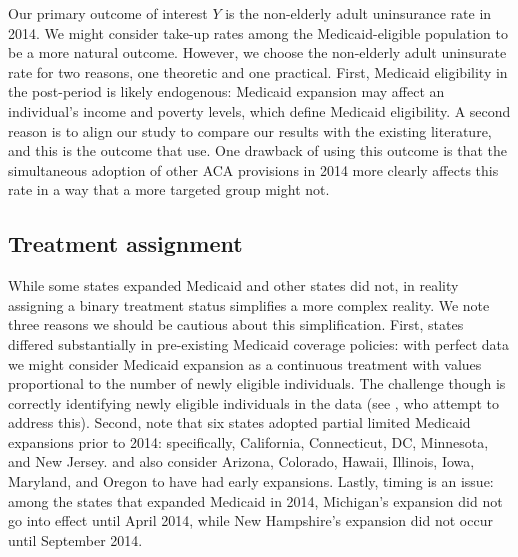\documentclass[12pt]{article}
\begin{document}
Our primary outcome of interest $Y$ is the non-elderly adult uninsurance rate in 2014. We might consider take-up rates among the Medicaid-eligible population to be a more natural outcome. However, we choose the non-elderly adult uninsurate rate for two reasons, one theoretic and one practical. First, Medicaid eligibility in the post-period is likely endogenous: Medicaid expansion may affect an individual's income and poverty levels, which define Medicaid eligibility. A second reason is to align our study to compare our results with the existing literature, and this is the outcome that \cite{courtemanche2017early} use. One drawback of using this outcome is that the simultaneous adoption of other ACA provisions in 2014 more clearly affects this rate in a way that a more targeted group might not.

\subsection{Treatment assignment}

While some states expanded Medicaid and other states did not, in reality assigning a binary treatment status simplifies a more complex reality. We note three reasons we should be cautious about this simplification. First, states differed substantially in pre-existing Medicaid coverage policies: with perfect data we might consider Medicaid expansion as a continuous treatment with values proportional to the number of newly eligible individuals. The challenge though is correctly identifying newly eligible individuals in the data (see \cite{frean2017premium}, who attempt to address this). Second, \cite{frean2017premium} note that six states adopted partial limited Medicaid expansions prior to 2014: specifically, California, Connecticut, DC, Minnesota, and New Jersey. \cite{kaestner2017effects} and \cite{courtemanche2017early} also consider Arizona, Colorado, Hawaii, Illinois, Iowa, Maryland, and Oregon to have had early expansions. Lastly, timing is an issue: among the states that expanded Medicaid in 2014, Michigan's expansion did not go into effect until April 2014, while New Hampshire's expansion did not occur until September 2014.
\end{document}
